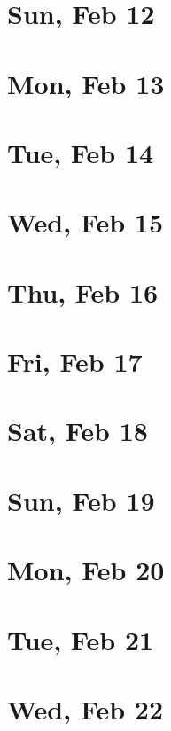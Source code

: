 	\section{Sun, Feb 12}
		
	\section{Mon, Feb 13}
		
	\section{Tue, Feb 14}
		
	\section{Wed, Feb 15}
		
	\section{Thu, Feb 16}
		
	\section{Fri, Feb 17}
		
	\section{Sat, Feb 18}
		
	\section{Sun, Feb 19}
		
	\section{Mon, Feb 20}
		
	\section{Tue, Feb 21}
		
	\section{Wed, Feb 22}
		
